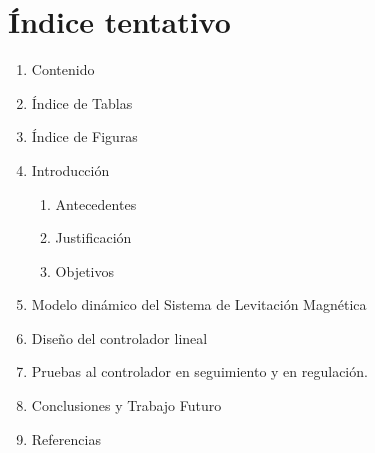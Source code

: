 \chapter{\'Indice tentativo}

\begin{enumerate}
  \setlength\itemsep{1.5ex}
  \item[]Contenido
  \item[] Índice de Tablas
  \item[] Índice de Figuras
  \item Introducción
    \begin{enumerate}
    \item Antecedentes
    \item Justificación
    \item Objetivos
  \end{enumerate}
  \item Modelo dinámico del Sistema de Levitación Magnética
  \item Diseño del controlador lineal
  \item Pruebas al controlador en seguimiento y en regulación.
  \item Conclusiones y Trabajo Futuro
  \item Referencias
  
\end{enumerate}